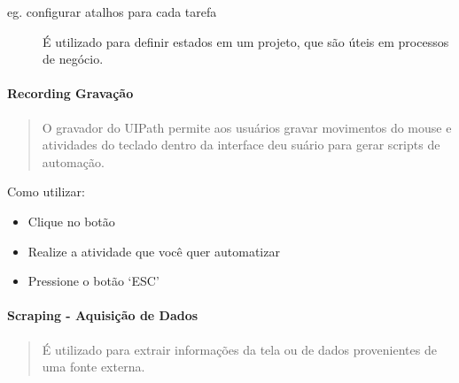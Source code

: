 \documentclass[letterpaper,10pt,brazil]{sphinxmanual}
\begin{document}
eg. configurar atalhos para cada tarefa
\begin{description}
\item[{}] \leavevmode
É utilizado para definir estados em um projeto, que são úteis em processos de negócio.

\end{description}


\paragraph{}
\label{\detokenize{interface_guide:componentes-do-uipath}}

\paragraph{}
\label{\detokenize{interface_guide:ribbon-barra-de-navegacao}}

\paragraph{Recording \textendash{} Gravação}
\label{\detokenize{interface_guide:recording-gravacao}}\begin{quote}

O gravador do UIPath permite aos usuários gravar movimentos do mouse e atividades do teclado dentro da interface deu suário para gerar scripts de automação.
\end{quote}

\noindent{}

Como utilizar:
\begin{itemize}
\item {} 
Clique no botão

\item {} 
Realize a atividade que você quer automatizar

\item {} 
Pressione o botão ‘ESC’

\end{itemize}


\paragraph{Scraping - Aquisição de Dados}
\label{\detokenize{interface_guide:scraping-aquisicao-de-dados}}\begin{quote}

É utilizado para extrair informações da tela ou de dados provenientes de uma fonte externa.
\end{quote}
\end{document}
